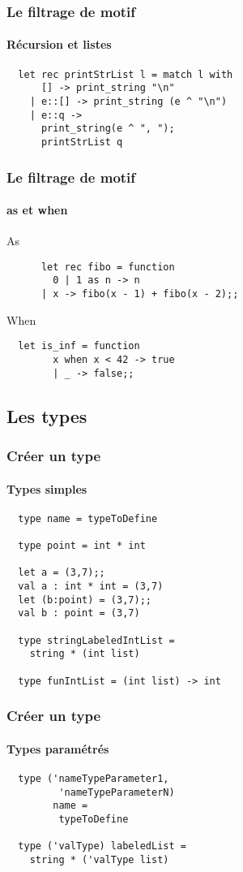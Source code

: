 \begin{frame}[fragile]
	\frametitle{Le filtrage de motif}
	\framesubtitle{Récursion et listes}
		\begin{lstlisting}
  let rec printStrList l = match l with
      [] -> print_string "\n"
    | e::[] -> print_string (e ^ "\n")
    | e::q -> 
      print_string(e ^ ", ");
      printStrList q
		\end{lstlisting}
\end{frame}

\begin{frame}[fragile]
  	\frametitle{Le filtrage de motif}
	\framesubtitle{as et when}
  	\begin{block}{As}
    	\begin{lstlisting}
	  let rec fibo = function 
 	    0 | 1 as n -> n 
 	  | x -> fibo(x - 1) + fibo(x - 2);; 
    	\end{lstlisting}
  	\end{block}
  	\begin{block}{When}
    	\begin{lstlisting}
  let is_inf = function 
        x when x < 42 -> true
    	| _ -> false;;
    	\end{lstlisting}
  	\end{block}
\end{frame}

\subsection{Les types} %
\begin{frame}[fragile]
	\frametitle{Créer un type}
	\framesubtitle{Types simples}
	\begin{lstlisting}
  type name = typeToDefine

  type point = int * int

  let a = (3,7);;
  val a : int * int = (3,7)
  let (b:point) = (3,7);;
  val b : point = (3,7)
  
  type stringLabeledIntList = 
    string * (int list)

  type funIntList = (int list) -> int
	\end{lstlisting}
\end{frame}

\begin{frame}[fragile]
	\frametitle{Créer un type}
	\framesubtitle{Types paramétrés}
	\begin{lstlisting}
  type ('nameTypeParameter1,
 	     'nameTypeParameterN) 
   	    name = 
         typeToDefine
    
  type ('valType) labeledList =
    string * ('valType list) 
	\end{lstlisting}
\end{frame}


